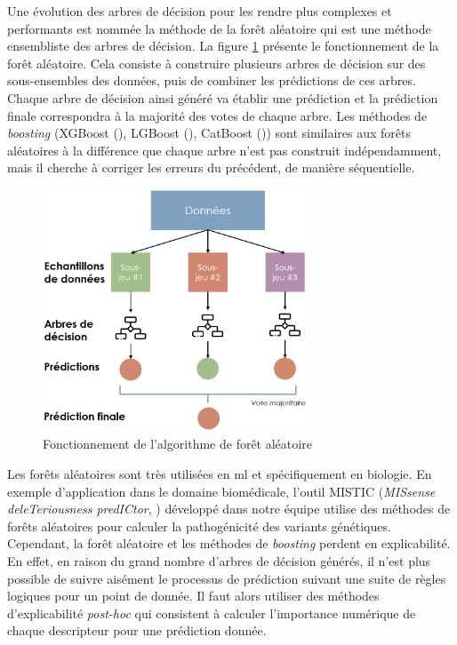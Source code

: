 Une évolution des arbres de décision pour les rendre plus complexes et performants est nommée la méthode de la forêt aléatoire qui est une méthode ensembliste des arbres de décision. La figure \ref{fig:random-forest} présente le fonctionnement de la forêt aléatoire. Cela consiste à construire plusieurs arbres de décision sur des sous-ensembles des données, puis de combiner les prédictions de ces arbres. Chaque arbre de décision ainsi généré va établir une prédiction et la prédiction finale correspondra à la majorité des votes de chaque arbre. Les méthodes de \textit{boosting}  (XGBoost (\cite{chen_xgboost_2016}), LGBoost (\cite{ke_lightgbm_2017}), CatBoost (\cite{prokhorenkova_catboost_2019})) sont similaires aux forêts aléatoires à la différence que chaque arbre n'est pas construit indépendamment, mais il cherche à corriger les erreurs du précédent, de manière séquentielle.
\begin{figure}[!ht]
 \centering
 \includegraphics[width=0.7\textwidth]{figures/random_forest.png}
 \caption[Fonctionnement de l'algorithme de forêt aléatoire]{Fonctionnement de l'algorithme de forêt aléatoire}
 \label{fig:random-forest}
\end{figure}
Les forêts aléatoires sont très utilisées en \gls{ml} et spécifiquement en biologie. En exemple d'application dans le domaine biomédicale, l'outil MISTIC (\textit{MISsense deleTeriousness predICtor}, \cite{chennen_mistic_2020}) développé dans notre équipe utilise des méthodes de forêts aléatoires pour calculer la pathogénicité des variants génétiques. Cependant, la forêt aléatoire et les méthodes de \textit{boosting} perdent en explicabilité. En effet, en raison du grand nombre d'arbres de décision générés, il n'est plus possible de suivre aisément le processus de prédiction suivant une suite de règles logiques pour un point de donnée. Il faut alors utiliser des méthodes d'explicabilité \textit{post-hoc} qui consistent à calculer l'importance numérique de chaque descripteur pour une prédiction donnée.

